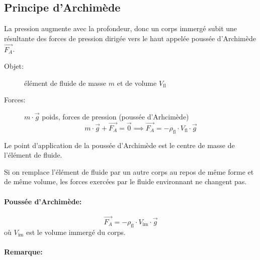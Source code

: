 \documentclass[
    11pt,
    a4paper,
    oneside,
    headinlcude, footinclude,
    twoside,
]{report}
\renewcommand{\vec}[1]{\overrightarrow{#1}}
\begin{document}
\subsection{Principe d'Archim\`ede}
\label{sub:principe_d_archim`ede}

La pression augmente avec la profondeur, donc un corps immerg\'e subit une
r\'esultante des forces de pression dirig\'ee vers le haut appel\'ee pouss\'ee
d'Archim\`ede $\vec{F_{A}}$.

\begin{center}
    \begin{minipage}{.5\linewidth}
    \end{minipage}
    \begin{minipage}{.49\linewidth}
        \setlength{\parskip}{.3em}
        \begin{description}
            \item[Objet:] \'el\'ement de fluide de masse $m$ et de volume $V_{\text{fl}}$
            \item[Forces:] $m\cdot \vec g$ poids, forces de pression (pouss\'ee
                d'Arhcim\`ede)
                $$m \cdot \vec g + \vec{F_{A}}  = \vec 0 \implies \vec{F_{A}} =
                - \rho_{\text{fl}} \cdot V_{\text{fl}} \cdot \vec g$$
        \end{description}
    \end{minipage}
\end{center}

Le point d'application de la pouss\'ee d'Archim\`ede est le centre de masse de
l'\'el\'ement de fluide.

Si on remplace l'\'el\'ement de fluide par un autre corps au repos de m\^eme
forme et de m\^eme volume, les forces exerc\'ees par le fluide environnant ne
changent pas.

\paragraph{Pouss\'ee d'Archim\`ede:}
\label{par:pouss'ee_d_archim`ede_}

\begin{equation}
    \label{eq:3.40} %
    \vec{F_{A}} = - \rho_{\text{fl}} \cdot V_{\text{im}} \cdot \vec g
\end{equation}
o\`u $V_{\text{im}}$ est le volume immerg\'e du corps.

\paragraph{Remarque:}
\end{document}
